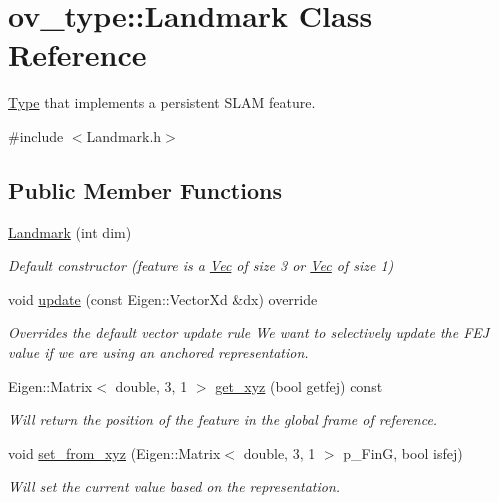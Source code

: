 \hypertarget{classov__type_1_1Landmark}{}\section{ov\+\_\+type\+:\+:Landmark Class Reference}
\label{classov__type_1_1Landmark}


\hyperlink{classov__type_1_1Type}{Type} that implements a persistent S\+L\+AM feature.  




{\ttfamily \#include $<$Landmark.\+h$>$}

\subsection*{Public Member Functions}
\begin{DoxyCompactItemize}
\item 
\mbox{\label{classov__type_1_1Landmark_afdfcac1cff90284cc815bd1c17c2659d}} 
\hyperlink{classov__type_1_1Landmark_afdfcac1cff90284cc815bd1c17c2659d}{Landmark} (int dim)
\begin{DoxyCompactList}\small\item\em Default constructor (feature is a \hyperlink{classov__type_1_1Vec}{Vec} of size 3 or \hyperlink{classov__type_1_1Vec}{Vec} of size 1) \end{DoxyCompactList}\item 
void \hyperlink{classov__type_1_1Landmark_aae8c688f5bb601edcb38fde41ff04297}{update} (const Eigen\+::\+Vector\+Xd \&dx) override
\begin{DoxyCompactList}\small\item\em Overrides the default vector update rule We want to selectively update the F\+EJ value if we are using an anchored representation. \end{DoxyCompactList}\item 
Eigen\+::\+Matrix$<$ double, 3, 1 $>$ \hyperlink{classov__type_1_1Landmark_aa4f66d5e3954beea3f05b8b757561132}{get\+\_\+xyz} (bool getfej) const
\begin{DoxyCompactList}\small\item\em Will return the position of the feature in the global frame of reference. \end{DoxyCompactList}\item 
void \hyperlink{classov__type_1_1Landmark_ac34319e2057c3c63154cef9a9aa08a2e}{set\+\_\+from\+\_\+xyz} (Eigen\+::\+Matrix$<$ double, 3, 1 $>$ p\+\_\+\+FinG, bool isfej)
\begin{DoxyCompactList}\small\item\em Will set the current value based on the representation. \end{DoxyCompactList}\end{DoxyCompactItemize}
